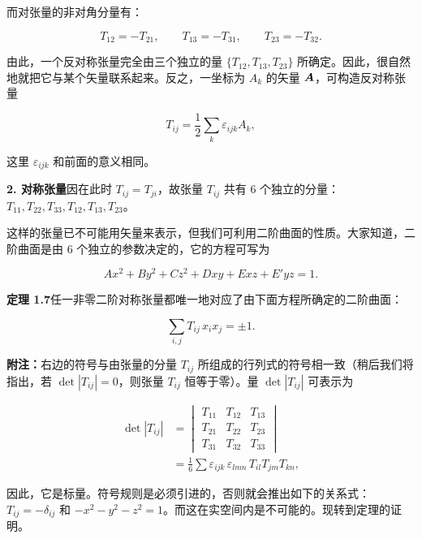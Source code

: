 而对张量的非对角分量有：

\begin{equation*}
T_{12} = -T_{21}, \qquad T_{13} = -T_{31}, \qquad T_{23} = -T_{32}.
\end{equation*}

由此，一个反对称张量完全由三个独立的量 $\{T_{12}, T_{13}, T_{23}\}$ 所确定。因此，很自然地就把它与某个矢量联系起来。反之，一坐标为 $A_k$ 的矢量 $\bm{A}$，可构造反对称张量

\begin{equation*}
T_{ij} = \frac{1}{2} \sum_{k} \varepsilon_{ijk} A_k,
\end{equation*}

这里 $\varepsilon_{ijk}$ 和前面的意义相同。

\textbf{2. 对称张量}\quad 因在此时 $T_{ij} = T_{ji}$，故张量 $T_{ij}$ 共有 6 个独立的分量：$T_{11}, T_{22}, T_{33}, T_{12}, T_{13}, T_{23}$。

这样的张量已不可能用矢量来表示，但我们可利用二阶曲面的性质。大家知道，二阶曲面是由 6 个独立的参数决定的，它的方程可写为

\begin{equation*}
A x^{2} + B y^{2} + C z^{2} + D xy + E xz + E' yz = 1.
\end{equation*}

\textbf{定理 1.7}\quad 任一非零二阶对称张量都唯一地对应了由下面方程所确定的二阶曲面：

\begin{equation}
\sum_{i,j} T_{ij}\, x_i x_j = \pm 1.
\tag{1.29}
\end{equation}

\textbf{附注：}右边的符号与由张量的分量 $T_{ij}$ 所组成的行列式的符号相一致（稍后我们将指出，若 $\det|T_{ij}| = 0$，则张量 $T_{ij}$ 恒等于零）。量 $\det|T_{ij}|$ 可表示为

\begin{equation}
\begin{aligned}
\det|T_{ij}| &=
\begin{vmatrix}
T_{11} & T_{12} & T_{13}\\
T_{21} & T_{22} & T_{23}\\
T_{31} & T_{32} & T_{33}
\end{vmatrix}\\
&= \frac{1}{6} \sum \varepsilon_{ijk}\, \varepsilon_{lmn}\, T_{il} T_{jm} T_{kn},
\end{aligned}
\tag{1.29a}
\end{equation}

因此，它是标量。符号规则是必须引进的，否则就会推出如下的关系式：$T_{ij} = -\delta_{ij}$ 和 $-x^{2} - y^{2} - z^{2} = 1$。而这在实空间内是不可能的。现转到定理的证明。

